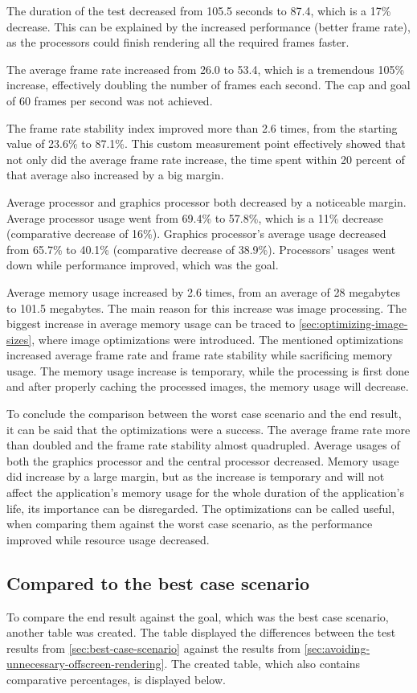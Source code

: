 \documentclass[a4paper,12pt]{article}
\begin{document}
The duration of the test decreased from 105.5 seconds to 87.4, which is a 17\% decrease. This can be explained by the increased performance (better frame rate), as the processors could finish rendering all the required frames faster.

The average frame rate increased from 26.0 to 53.4, which is a tremendous 105\% increase, effectively doubling the number of frames each second. The cap and goal of 60 frames per second was not achieved.

The frame rate stability index improved more than 2.6 times, from the starting value of 23.6\% to 87.1\%. This custom measurement point effectively showed that not only did the average frame rate increase, the time spent within 20 percent of that average also increased by a big margin.

Average processor and graphics processor both decreased by a noticeable margin. Average processor usage went from 69.4\% to 57.8\%, which is a 11\% decrease (comparative decrease of 16\%). Graphics processor's average usage decreased from 65.7\% to 40.1\% (comparative decrease of 38.9\%). Processors' usages went down while performance improved, which was the goal.

Average memory usage increased by 2.6 times, from an average of 28 megabytes to 101.5 megabytes. The main reason for this increase was image processing. The biggest increase in average memory usage can be traced to \autoref{sec:optimizing-image-sizes}, where image optimizations were introduced. The mentioned optimizations increased average frame rate and frame rate stability while sacrificing memory usage. The memory usage increase is temporary, while the processing is first done and after properly caching the processed images, the memory usage will decrease.

To conclude the comparison between the worst case scenario and the end result, it can be said that the optimizations were a success. The average frame rate more than doubled and the frame rate stability almost quadrupled. Average usages of both the graphics processor and the central processor decreased. Memory usage did increase by a large margin, but as the increase is temporary and will not affect the application's memory usage for the whole duration of the application's life, its importance can be disregarded. The optimizations can be called useful, when comparing them against the worst case scenario, as the performance improved while resource usage decreased.

\newpage
\subsection{Compared to the best case scenario}
To compare the end result against the goal, which was the best case scenario, another table was created. The table displayed the differences between the test results from \autoref{sec:best-case-scenario} against the results from \autoref{sec:avoiding-unnecessary-offscreen-rendering}. The created table, which also contains comparative percentages, is displayed below.
\end{document}
